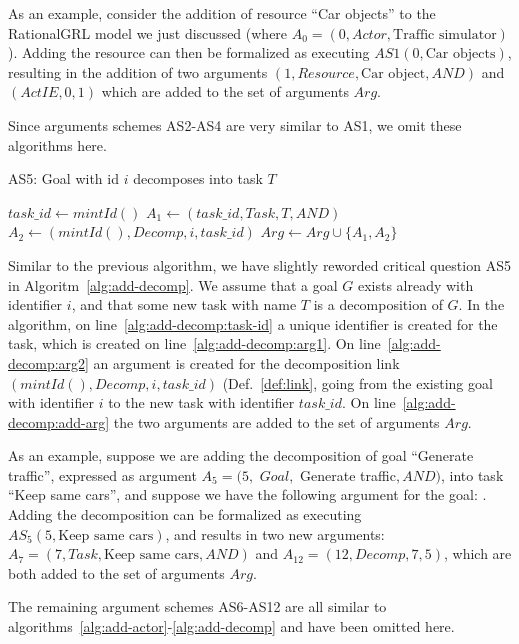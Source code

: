 As an example, consider the addition of resource ``Car objects'' to the RationalGRL model we just discussed (where $A_0 = (0, Actor, \text{Traffic simulator})$). Adding the resource can then be formalized as executing $AS1(0, \text{Car objects})$, resulting in the addition of two arguments $(1, Resource, \text{Car object}, AND)$ and $(ActIE, 0, 1)$ which are added to the set of arguments $Arg$.

Since arguments schemes AS2-AS4 are very similar to AS1, we omit these algorithms here.

\begin{algorithm}[h]
  \caption{AS5: Goal with id $i$ decomposes into task $T$}\label{alg:add-decomp}
  \begin{algorithmic}[1]
    \State $task\_id\gets mintId()$\label{alg:add-decomp:task-id}
    \State $A_1\leftarrow (task\_id, Task, T, AND)$\label{alg:add-decomp:arg1}
    \State $A_2\leftarrow (mintId(), Decomp, i, task\_id)$\label{alg:add-decomp:arg2}
    \State $Arg\gets Arg\cup \{A_1,A_2\}$\label{alg:add-decomp:add-arg}
    \EndProcedure
  \end{algorithmic}
\end{algorithm}

Similar to the previous algorithm, we have slightly reworded critical question AS5 in Algoritm~\ref{alg:add-decomp}. We assume that a goal $G$ exists already with identifier $i$, and that some new task with name $T$ is a decomposition of $G$. In the algorithm, on line~\ref{alg:add-decomp:task-id} a unique identifier is created for the task, which is created on line~\ref{alg:add-decomp:arg1}. On line~\ref{alg:add-decomp:arg2} an argument is created for the decomposition link $(mintId(), Decomp, i, task\_id)$ (Def.~\ref{def:link}, going from the existing goal with identifier $i$ to the new task with identifier $task\_id$. On line~\ref{alg:add-decomp:add-arg} the two arguments are added to the set of arguments $Arg$.

As an example, suppose we are adding the decomposition of goal ``Generate traffic'', expressed as argument $A_5 = (5,$ $Goal,$ Generate traffic$, AND)$, into task ``Keep same cars'', and suppose we have the following argument for the goal: . Adding the decomposition can be formalized as executing $AS_5(5, \text{Keep same cars})$, and results in two new arguments: $A_7 = (7, Task, \text{Keep same cars}, AND)$ and $A_{12} = (12, Decomp, 7, 5)$, which are both added to the set of arguments $Arg$.

The remaining argument schemes AS6-AS12 are all similar to algorithms~\ref{alg:add-actor}-\ref{alg:add-decomp} and have been omitted here.


